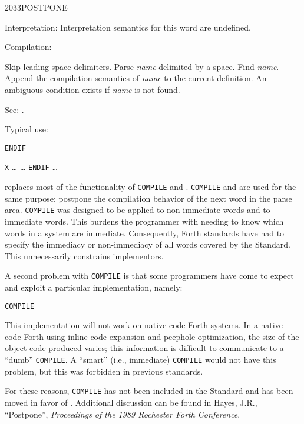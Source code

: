 \begin{newword*}{2033}{POSTPONE}
\item[Interpretation:]
	Interpretation semantics for this word are undefined.

\item[Compilation:]

	Skip leading space delimiters. Parse \emph{name} delimited by
	a space. Find \emph{name}. Append the compilation semantics of
	\emph{name} to the current definition. An ambiguous condition
	exists if \emph{name} is not found.

\item[See:]
	.

	\begin{rationale} %
		Typical use:

		\tab \word{:} \texttt{ENDIF}
			 
		\word{;} 

		\tab \word{:} \texttt{X} {\ldots}
			 {\ldots} \texttt{ENDIF}
		{\ldots} \word{;}

		 replaces most of the functionality of
		\texttt{COMPILE} and  \word{[COMPILE]}. \texttt{COMPILE} and
		\word{[COMPILE]} are used for the same purpose: postpone the
		compilation behavior of the next word in the parse area.
		\texttt{COMPILE} was designed to be applied to non-immediate
		words and \word{[COMPILE]} to immediate words. This burdens
		the programmer with needing to know which words in a system
		are immediate. Consequently, Forth standards have had to
		specify the immediacy or non-immediacy of all words covered by
		the Standard. This unnecessarily constrains implementors.

		A second problem with \texttt{COMPILE} is that some
		programmers have come to expect and exploit a particular
		implementation, namely:

		\tab \word{:} \texttt{COMPILE} 
			  \word{,}  
		\word{;}

		This implementation will not work on native code Forth systems.
		In a native code Forth using inline code expansion and peephole
		optimization, the size of the object code produced varies; this
		information is difficult to communicate to a ``dumb''
		\texttt{COMPILE}. A ``smart'' (i.e., immediate) \texttt{COMPILE}
		would not have this problem, but this was forbidden in previous
		standards.

		For these reasons, \texttt{COMPILE} has not been included in
		the Standard and \word{[COMPILE]} has been moved in favor of
		. Additional discussion can be found in Hayes,
		J.R., ``Postpone'', \emph{Proceedings of the 1989 Rochester
		Forth Conference}.
	\end{rationale}
\end{newword*}


